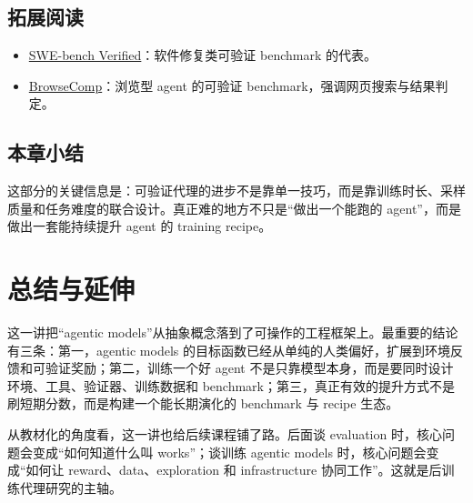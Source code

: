 \documentclass[a4paper]{article}
\begin{document}
\subsection{拓展阅读}
\begin{itemize}
  \item \href{https://openai.com/index/introducing-swe-bench-verified/}{SWE-bench Verified}：软件修复类可验证 benchmark 的代表。
  \item \href{https://openai.com/index/browsecomp/}{BrowseComp}：浏览型 agent 的可验证 benchmark，强调网页搜索与结果判定。
\end{itemize}

\subsection{本章小结}
这部分的关键信息是：可验证代理的进步不是靠单一技巧，而是靠训练时长、采样质量和任务难度的联合设计。真正难的地方不只是“做出一个能跑的 agent”，而是做出一套能持续提升 agent 的 training recipe。

\section{总结与延伸}
这一讲把“agentic models”从抽象概念落到了可操作的工程框架上。最重要的结论有三条：第一，agentic models 的目标函数已经从单纯的人类偏好，扩展到环境反馈和可验证奖励；第二，训练一个好 agent 不是只靠模型本身，而是要同时设计环境、工具、验证器、训练数据和 benchmark；第三，真正有效的提升方式不是刷短期分数，而是构建一个能长期演化的 benchmark 与 recipe 生态。

从教材化的角度看，这一讲也给后续课程铺了路。后面谈 evaluation 时，核心问题会变成“如何知道什么叫 works”；谈训练 agentic models 时，核心问题会变成“如何让 reward、data、exploration 和 infrastructure 协同工作”。这就是后训练代理研究的主轴。
\end{document}
